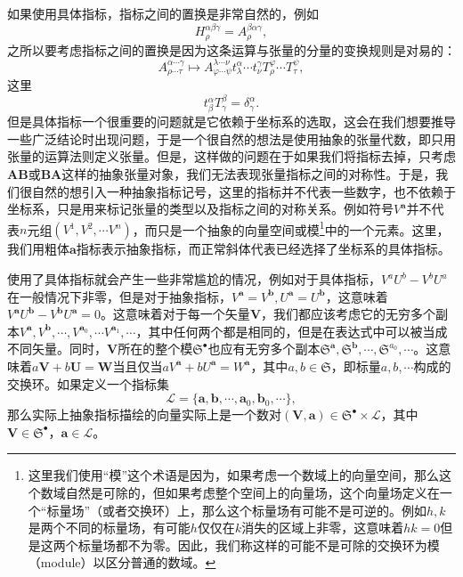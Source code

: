 如果使用具体指标，指标之间的置换是非常自然的，例如
\begin{equation*}
	H_{\rho }^{\alpha \beta \gamma } =A_{\rho }^{\beta \alpha \gamma } ,
\end{equation*}
之所以要考虑指标之间的置换是因为这条运算与张量的分量的变换规则是对易的：
\begin{equation*}
	A_{\rho \cdots \tau }^{\alpha \cdots \gamma } \mapsto A_{\varphi \cdots \psi }^{\lambda \cdots \nu } t_{\lambda }^{\alpha } \cdots t_{\nu }^{\gamma } T_{\rho }^{\varphi } \cdots T_{\tau }^{\psi } ,
\end{equation*}
这里
\begin{equation*}
	t_{\beta }^{\alpha } T_{\gamma }^{\beta } =\delta _{\gamma }^{\alpha } .
\end{equation*}
但是具体指标一个很重要的问题就是它依赖于坐标系的选取，这会在我们想要推导一些广泛结论时出现问题，于是一个很自然的想法是使用抽象的张量代数，即只用张量的运算法则定义张量。但是，这样做的问题在于如果我们将指标去掉，只考虑$\boldsymbol{AB}$或$\boldsymbol{BA}$这样的抽象张量对象，我们无法表现张量指标之间的对称性。于是，我们很自然的想引入一种抽象指标记号，这里的指标并不代表一些数字，也不依赖于坐标系，只是用来标记张量的类型以及指标之间的对称关系。例如符号$V^{\boldsymbol{a}}$并不代表$n$元组$(V^{1} ,V^{2} ,\cdots V^{n} )$，而只是一个抽象的向量空间或模\footnote{这里我们使用“模”这个术语是因为，如果考虑一个数域上的向量空间，那么这个数域自然是可除的，但如果考虑整个空间上的向量场，这个向量场定义在一个“标量场”（或者交换环）上，那么这个标量场有可能不是可逆的。例如$h,k$是两个不同的标量场，有可能$h$仅仅在$k$消失的区域上非零，这意味着$hk=0$但是这两个标量场都不为零。因此，我们称这样的可能不是可除的交换环为模（module）以区分普通的数域。}中的一个元素。这里，我们用粗体$\boldsymbol{a}$指标表示抽象指标，而正常斜体代表已经选择了坐标系的具体指标。



使用了具体指标就会产生一些非常尴尬的情况，例如对于具体指标，$V^{a} U^{b} -V^{b} U^{a}$在一般情况下非零，但是对于抽象指标，$V^{\boldsymbol{a}} =V^{\boldsymbol{b}} ,U^{\boldsymbol{a}} =U^{\boldsymbol{b}}$，这意味着$V^{\boldsymbol{a}} U^{\boldsymbol{b}} -V^{\boldsymbol{b}} U^{\boldsymbol{a}} =0$。这意味着对于每一个矢量$\boldsymbol{V}$，我们都应该考虑它的无穷多个副本$V^{\boldsymbol{a}} ,V^{\boldsymbol{b}} ,\cdots ,V^{\boldsymbol{a}_{0}} ,\cdots V^{\boldsymbol{a}_{1}} ,\cdots $，其中任何两个都是相同的，但是在表达式中可以被当成不同矢量。同时，$\boldsymbol{V}$所在的整个模$\mathfrak{S}^{\bullet }$也应有无穷多个副本$\mathfrak{S}^{\boldsymbol{a}} ,\mathfrak{S}^{\boldsymbol{b}} ,\cdots ,\mathfrak{S}^{a_{0}} ,\cdots $。这意味着$a\boldsymbol{V} +b\boldsymbol{U} =\boldsymbol{W}$当且仅当$aV^{\boldsymbol{a}} +bU^{\boldsymbol{a}} =W^{\boldsymbol{a}}$，其中$a,b\in \mathfrak{S}$，即标量$a,b,\cdots $构成的交换环。如果定义一个指标集
\begin{equation*}
	\mathcal{L} =\{\boldsymbol{a} ,\boldsymbol{b} ,\cdots ,\boldsymbol{a}_{0} ,\boldsymbol{b}_{0} ,\cdots \} ,
\end{equation*}
那么实际上抽象指标描绘的向量实际上是一个数对$(\boldsymbol{V} ,\boldsymbol{a}) \in \mathfrak{S}^{\bullet } \times \mathcal{L}$，其中$\boldsymbol{V} \in \mathfrak{S}^{\bullet }$，$\boldsymbol{a} \in \mathcal{L}$。

